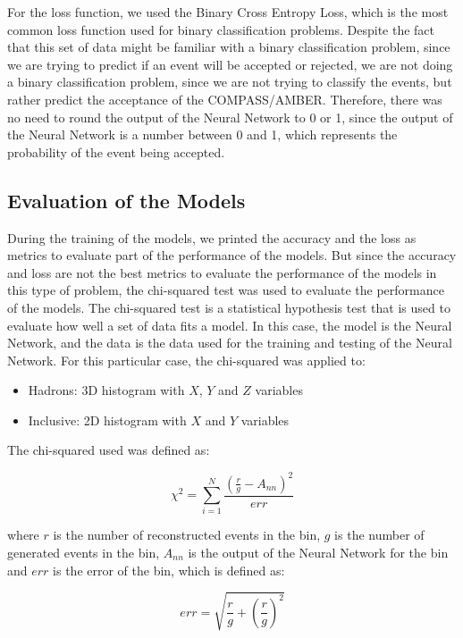 \documentclass{article}
\begin{document}
For the loss function, we used the Binary Cross Entropy Loss, which is the most common loss function used for binary classification problems.
Despite the fact that this set of data might be familiar with a binary classification problem, since we are trying to predict if an event will be accepted or rejected,
we are not doing a binary classification problem, since we are not trying to classify the events, but rather predict the acceptance of the COMPASS/AMBER.
Therefore, there was no need to round the output of the Neural Network to 0 or 1, since the output of the Neural Network is a number between 0 and 1, which represents the probability of the event being accepted.

\subsection{Evaluation of the Models}

During the training of the models, we printed the accuracy and the loss as metrics to evaluate part of the performance of the models.
But since the accuracy and loss are not the best metrics to evaluate the performance of the models in this type of problem, the chi-squared test was used to evaluate the performance of the models.
The chi-squared test is a statistical hypothesis test that is used to evaluate how well a set of data fits a model. In this case, the model is the Neural Network, and the data is the data used for the training and testing of the Neural Network.
For this particular case, the chi-squared was applied to:
\begin{itemize}
    \item Hadrons: 3D histogram with $X$, $Y$ and $Z$ variables
    \item Inclusive: 2D histogram with $X$ and $Y$ variables
\end{itemize}

The chi-squared used was defined as:

\begin{equation}
    \chi^2 = \sum_{i=1}^{N} \frac{(\frac{r}{g} - A_{nn})^2}{err}
\end{equation}
    
where $r$ is the number of reconstructed events in the bin, $g$ is the number of generated events in the bin, $A_{nn}$ is the output of the Neural Network for the bin and $err$ is the error of the bin, which is defined as:

\begin{equation}
    err = \sqrt{\frac{r}{g} + (\frac{r}{g})^2}
\end{equation}
\end{document}
